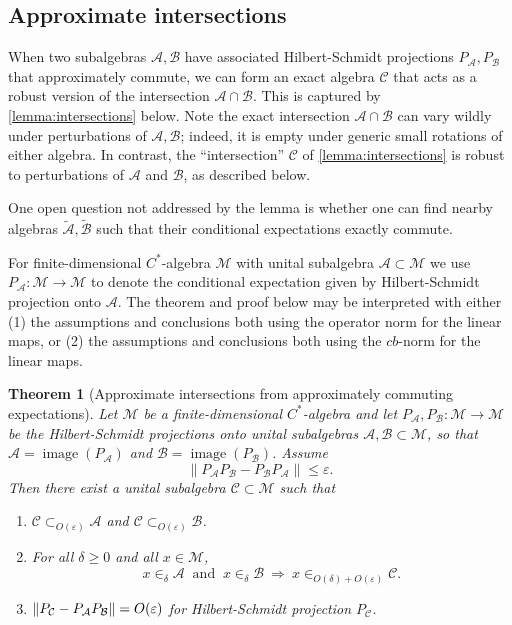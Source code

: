 \documentclass[11pt,reqno]{amsart}
\newtheorem{theorem}{Theorem}[section]
\theoremstyle{definition}
\theoremstyle{remark}
\numberwithin{equation}{section}
\DeclareMathOperator{\image}{image}
\newcommand{\eps}{\varepsilon}
\newcommand{\cA}{\mathcal A}
\newcommand{\cB}{\mathcal B}
\newcommand{\cC}{\mathcal C}
\newcommand{\cM}{\mathcal M}
\DeclarePairedDelimiter\norm{\lVert}{\rVert}
\begin{document}
\subsection{Approximate intersections}

When two subalgebras $\cA, \cB$ have associated Hilbert-Schmidt projections $P_\cA, P_\cB$ that approximately commute, we can form an exact algebra $\cC$ that acts as a robust version of the intersection $\cA \cap \cB$.
This is captured by \cref{lemma:intersections} below. Note the exact intersection $\cA \cap \cB$ can vary wildly under perturbations of $\cA, \cB$; indeed, it is empty under generic small rotations of either algebra.
In contrast, the ``intersection'' $\cC$ of  \cref{lemma:intersections} is robust to perturbations of $\cA$ and $\cB$, as described below.

One open question not addressed by the lemma is whether one can find nearby algebras $\tilde{\cA}, \tilde{\cB}$ such that their conditional expectations exactly commute.

For finite-dimensional $C^*$-algebra $\cM$ with unital subalgebra $\cA \subset \cM$ we use $P_\cA : \cM \to \cM$ to denote the conditional expectation given by Hilbert-Schmidt projection onto $\cA$. The theorem and proof below may be interpreted with either (1) the assumptions and conclusions both using the operator norm for the linear maps, or (2) the assumptions and conclusions both using the $cb$-norm for the linear maps.

\begin{theorem}[Approximate intersections from approximately commuting expectations]\label{lemma:robust-intersection} \label{lemma:intersections}
Let $\cM$ be a finite-dimensional $C^*$-algebra and let $P_{\cA},P_{\cB}:\cM\to\cM$ be the Hilbert-Schmidt projections onto unital subalgebras $\cA, \cB \subset \cM$, so that
$\cA=\image(P_{\cA})$ and $\cB=\image(P_{\cB})$. Assume
\[
\|P_{\cA}P_{\cB}-P_{\cB}P_{\cA}\|\le \eps.
\]
Then there exist a unital subalgebra $\cC\subset \cM$ such that
\begin{enumerate}[label=(\alph*)]
\item $\cC\subset_{O(\eps)}\cA$ and $\cC\subset_{O(\eps)}\cB$.
\item For all $\delta\ge 0$ and all $x\in\cM$,
\[
x\in_\delta \cA \ \text{ and }\ x\in_\delta \cB \ \Longrightarrow\ x\in_{O(\delta)+O(\eps)} \cC.
\]
\item  $\norm{P_{\cC}- P_{\cA}P_{\cB}} = O(\eps)$
for Hilbert-Schmidt projection $P_\cC$.
\end{enumerate}
\end{theorem}
\end{document}
